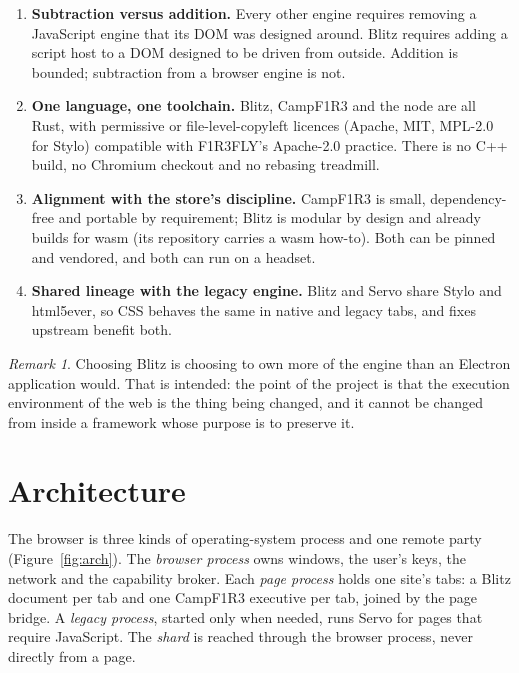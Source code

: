 \documentclass[11pt]{article}
\theoremstyle{definition}
\theoremstyle{remark}
\newtheorem{remark}{Remark}
\newcommand{\Camp}{CampF1R3}
\begin{document}
\begin{enumerate}
\item \textbf{Subtraction versus addition.} Every other engine requires removing a
  JavaScript engine that its DOM was designed around. Blitz requires adding a script
  host to a DOM designed to be driven from outside. Addition is bounded; subtraction
  from a browser engine is not.
\item \textbf{One language, one toolchain.} Blitz, \Camp{} and the node are all
  Rust, with permissive or file-level-copyleft licences (Apache, MIT, MPL-2.0 for
  Stylo) compatible with F1R3FLY's Apache-2.0 practice. There is no C++ build, no
  Chromium checkout and no rebasing treadmill.
\item \textbf{Alignment with the store's discipline.} \Camp{} is small,
  dependency-free and portable by requirement; Blitz is modular by design and
  already builds for wasm (its repository carries a wasm how-to). Both can be
  pinned and vendored, and both can run on a headset.
\item \textbf{Shared lineage with the legacy engine.} Blitz and Servo share Stylo
  and html5ever, so CSS behaves the same in native and legacy tabs, and fixes
  upstream benefit both.
\end{enumerate}

\begin{remark}
Choosing Blitz is choosing to own more of the engine than an Electron application
would. That is intended: the point of the project is that the execution environment
of the web is the thing being changed, and it cannot be changed from inside a
framework whose purpose is to preserve it.
\end{remark}

\section{Architecture}\label{sec:arch}

The browser is three kinds of operating-system process and one remote party
(Figure~\ref{fig:arch}). The \emph{browser process} owns windows, the user's keys,
the network and the capability broker. Each \emph{page process} holds one site's
tabs: a Blitz document per tab and one \Camp{} executive per tab, joined by the page
bridge. A \emph{legacy process}, started only when needed, runs Servo for pages that
require JavaScript. The \emph{shard} is reached through the browser process, never
directly from a page.
\end{document}
